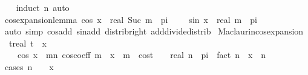 \begin{isabellebody}
%
\isadelimproof
\ \ %
\endisadelimproof
%
\isatagproof
{}\isamarkupfalse%
\ {\isacharparenleft}{\kern0pt}induct\ n{\isacharparenright}{\kern0pt}\ auto%
\endisatagproof
{\isafoldproof}%
%
\isadelimproof
\isanewline
%
\endisadelimproof
\isanewline
{}\isamarkupfalse%
\ cos{\isacharunderscore}{\kern0pt}expansion{\isacharunderscore}{\kern0pt}lemma{\isacharcolon}{\kern0pt}\ {\isachardoublequoteopen}cos\ {\isacharparenleft}{\kern0pt}x\ {\isacharplus}{\kern0pt}\ real\ {\isacharparenleft}{\kern0pt}Suc\ m{\isacharparenright}{\kern0pt}\ {\isacharasterisk}{\kern0pt}\ pi\ {\isacharslash}{\kern0pt}\ {}{\isacharparenright}{\kern0pt}\ {\isacharequal}{\kern0pt}\ {\isacharminus}{\kern0pt}\ sin\ {\isacharparenleft}{\kern0pt}x\ {\isacharplus}{\kern0pt}\ real\ m\ {\isacharasterisk}{\kern0pt}\ pi\ {\isacharslash}{\kern0pt}\ {}{\isacharparenright}{\kern0pt}{\isachardoublequoteclose}\isanewline
%
\isadelimproof
\ \ %
\endisadelimproof
%
\isatagproof
{}\isamarkupfalse%
\ {\isacharparenleft}{\kern0pt}auto\ simp{\isacharcolon}{\kern0pt}\ cos{\isacharunderscore}{\kern0pt}add\ sin{\isacharunderscore}{\kern0pt}add\ distrib{\isacharunderscore}{\kern0pt}right\ add{\isacharunderscore}{\kern0pt}divide{\isacharunderscore}{\kern0pt}distrib{\isacharparenright}{\kern0pt}%
\endisatagproof
{\isafoldproof}%
%
\isadelimproof
\isanewline
%
\endisadelimproof
\isanewline
{}\isamarkupfalse%
\ Maclaurin{\isacharunderscore}{\kern0pt}cos{\isacharunderscore}{\kern0pt}expansion{\isacharcolon}{\kern0pt}\isanewline
\ \ {\isachardoublequoteopen}{\isasymexists}t{\isacharcolon}{\kern0pt}{\isacharcolon}{\kern0pt}real{\isachardot}{\kern0pt}\ {\isasymbar}t{\isasymbar}\ {\isasymle}\ {\isasymbar}x{\isasymbar}\ {\isasymand}\isanewline
\ \ \ \ cos\ x\ {\isacharequal}{\kern0pt}\ {\isacharparenleft}{\kern0pt}{\isasymSum}m{\isacharless}{\kern0pt}n{\isachardot}{\kern0pt}\ cos{\isacharunderscore}{\kern0pt}coeff\ m\ {\isacharasterisk}{\kern0pt}\ x\ {\isacharcircum}{\kern0pt}\ m{\isacharparenright}{\kern0pt}\ {\isacharplus}{\kern0pt}\ {\isacharparenleft}{\kern0pt}cos{\isacharparenleft}{\kern0pt}t\ {\isacharplus}{\kern0pt}\ {}{\isacharslash}{\kern0pt}{}\ {\isacharasterisk}{\kern0pt}\ real\ n\ {\isacharasterisk}{\kern0pt}\ pi{\isacharparenright}{\kern0pt}\ {\isacharslash}{\kern0pt}\ fact\ n{\isacharparenright}{\kern0pt}\ {\isacharasterisk}{\kern0pt}\ x\ {\isacharcircum}{\kern0pt}\ n{\isachardoublequoteclose}\isanewline
%
\isadelimproof
%
\endisadelimproof
%
\isatagproof
{}\isamarkupfalse%
\ {\isacharparenleft}{\kern0pt}cases\ {\isachardoublequoteopen}n\ {\isacharequal}{\kern0pt}\ {}\ {\isasymor}\ x\ {\isacharequal}{\kern0pt}\ {}{\isachardoublequoteclose}{\isacharparenright}{\kern0pt}\isanewline

\end{isabellebody}
